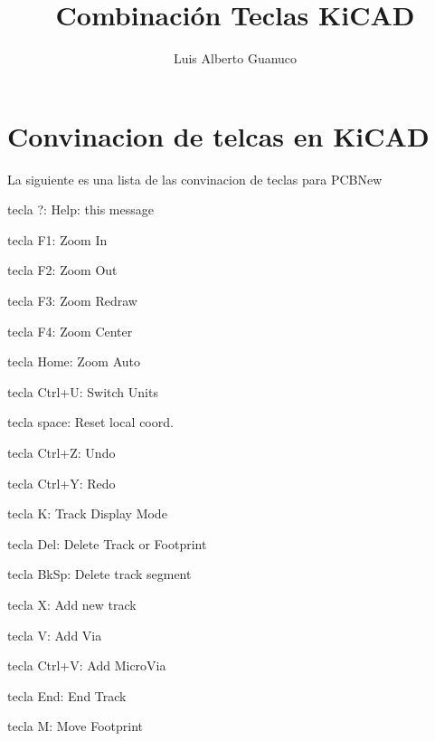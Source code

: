 \documentclass[11pt,a4paper,twocolomn]{article}
\author{Luis Alberto Guanuco}
\title{Combinación Teclas KiCAD}
\begin{document}
\maketitle
\section[twocolomn]{Convinacion de telcas en KiCAD}
La siguiente es una lista de las convinacion de teclas para PCBNew
\begin{multicols}{2}
\begin{description}

\item tecla ?:    Help: this message\\
\item tecla F1:    Zoom In\\
\item tecla F2:    Zoom Out\\
\item tecla F3:    Zoom Redraw\\
\item tecla F4:    Zoom Center\\
\item tecla Home:    Zoom Auto\\
\item tecla Ctrl+U:    Switch Units\\
\item tecla space:    Reset local coord.\\
\item tecla Ctrl+Z:    Undo\\
\item tecla Ctrl+Y:    Redo\\
\item tecla K:    Track Display Mode\\
\item tecla Del:    Delete Track or Footprint\\
\item tecla BkSp:    Delete track segment\\
\item tecla X:    Add new track\\
\item tecla V:    Add Via\\
\item tecla Ctrl+V:    Add MicroVia\\
\item tecla End:    End Track\\
\item tecla M:    Move Footprint\\

\end{description}
\end{multicols}
\end{document}
